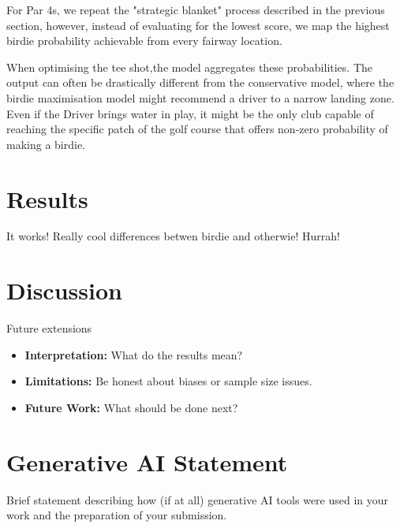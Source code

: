 \documentclass[11pt, letterpaper]{article}
\begin{document}
For Par 4s, we repeat the "strategic blanket" process described in the previous section, however, instead of evaluating for the lowest score, we map the highest birdie probability achievable from every fairway location.

When optimising the tee shot,the model aggregates these probabilities. The output can often be drastically different from the conservative model, where the birdie maximisation model might recommend a driver to a narrow landing zone. Even if the Driver brings water in play, it might be the only club capable of reaching the specific patch of the golf course that offers non-zero probability of making a birdie.





\section{Results}

It works! Really cool differences betwen birdie and otherwie! Hurrah!


\section{Discussion}
Future extensions

\begin{itemize}
    \item \textbf{Interpretation:} What do the results mean?
    \item \textbf{Limitations:} Be honest about biases or sample size issues.
    \item \textbf{Future Work:} What should be done next? \cite{qgis}
\end{itemize}

\newpage 
\printbibliography[title={References}]

\vspace{2cm}

\section*{Generative AI Statement}
\noindent
Brief statement describing how (if at all) generative AI tools were used in your work and the preparation of your submission.
\end{document}
